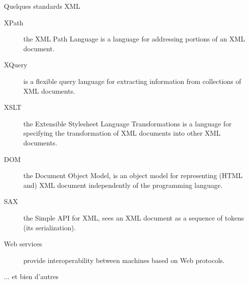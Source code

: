 \begin{frame}[containsverbatim]{Quelques standards XML}
 
\begin{description}
\item[XPath] the XML Path Language is a language for addressing portions of an XML document. 
\item[XQuery] is a flexible query language for extracting information from collections of XML documents. 
\item[XSLT] the Extensible Stylesheet Language Transformations is a language for specifying the transformation of XML documents into other XML documents. 
\item[DOM] the Document Object Model, is an object model for representing (HTML and) XML document independently of the programming language. 
\item[SAX] the Simple API for XML, sees an XML document as a sequence of tokens (its serialization). 
\item[Web services] provide interoperability between machines based on Web protocols. 
\item[... et bien d'autres]
\end{description}
\end{frame}









